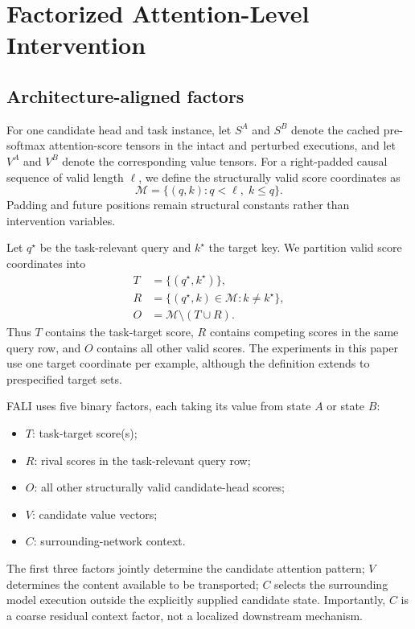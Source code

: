 \section{Factorized Attention-Level Intervention}\label{sec:fali}

\subsection{Architecture-aligned factors}\label{sec:factors}

For one candidate head and task instance, let $S^{A}$ and $S^{B}$ denote the cached pre-softmax attention-score tensors in the intact and perturbed executions, and let $V^{A}$ and $V^{B}$ denote the corresponding value tensors. For a right-padded causal sequence of valid length $\ell$, we define the structurally valid score coordinates as
\begin{equation}
\mathcal{M}=\{(q,k):q<\ell,\;k\le q\}.
\label{eq:valid-mask}
\end{equation}
Padding and future positions remain structural constants rather than intervention variables.

Let $q^{\star}$ be the task-relevant query and $k^{\star}$ the target key. We partition valid score coordinates into
\begin{align}
T &= \{(q^{\star},k^{\star})\},\\
R &= \{(q^{\star},k)\in\mathcal{M}:k\neq k^{\star}\},\\
O &= \mathcal{M}\setminus(T\cup R).
\label{eq:tro-partition}
\end{align}
Thus $T$ contains the task-target score, $R$ contains competing scores in the same query row, and $O$ contains all other valid scores. The experiments in this paper use one target coordinate per example, although the definition extends to prespecified target sets.

FALI uses five binary factors, each taking its value from state $A$ or state $B$:
\begin{itemize}
    \item $T$: task-target score(s);
    \item $R$: rival scores in the task-relevant query row;
    \item $O$: all other structurally valid candidate-head scores;
    \item $V$: candidate value vectors;
    \item $C$: surrounding-network context.
\end{itemize}
The first three factors jointly determine the candidate attention pattern; $V$ determines the content available to be transported; $C$ selects the surrounding model execution outside the explicitly supplied candidate state. Importantly, $C$ is a coarse residual context factor, not a localized downstream mechanism.

